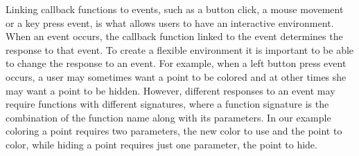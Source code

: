\documentclass[11pt]{article}
\newcommand{\Rslot}[1]{\textsl{#1}}
\newcommand{\Rclass}[1]{\texttt{#1}}
\begin{document}
Linking callback functions to events, such as a button click, a mouse
movement or a key press event, is what allows users to have an
interactive environment.  When an event occurs, the callback function
linked to the event determines the response to that event.  To create
a flexible environment it is important to be able to change the
response to an event.  For example, when a left button press event
occurs, a user may sometimes want a point to be colored and at other
times she may want a point to be hidden.  However, different responses
to an event may require functions with different signatures, where a function
signature is the combination of the function name along with its parameters.
In our example coloring a point requires two parameters, the new color to use
and the point to color, while hiding a point requires just one parameter, the
point to hide.  


\end{document}
